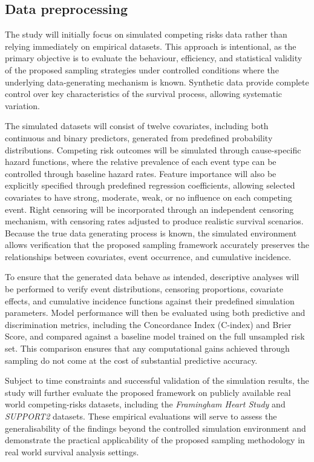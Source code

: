 \documentclass[a4paper,twoside,12pt]{report}
\begin{document}
\subsection{Data preprocessing}

The study will initially focus on simulated competing risks data rather than relying immediately on empirical datasets. This approach is intentional, as the primary objective is to evaluate the behaviour, efficiency, and statistical validity of the proposed sampling strategies under controlled conditions where the underlying data-generating mechanism is known. Synthetic data provide complete control over key characteristics of the survival process, allowing systematic variation.

The simulated datasets will consist of twelve covariates, including both continuous and binary predictors, generated from predefined probability distributions. Competing risk outcomes will be simulated through cause-specific hazard functions, where the relative prevalence of each event type can be controlled through baseline hazard rates. Feature importance will also be explicitly specified through predefined regression coefficients, allowing selected covariates to have strong, moderate, weak, or no influence on each competing event. Right censoring will be incorporated through an independent censoring mechanism, with censoring rates adjusted to produce realistic survival scenarios. Because the true data generating process is known, the simulated environment allows verification that the proposed sampling framework accurately preserves the relationships between covariates, event occurrence, and cumulative incidence.

To ensure that the generated data behave as intended, descriptive analyses will be performed to verify event distributions, censoring proportions, covariate effects, and cumulative incidence functions against their predefined simulation parameters. Model performance will then be evaluated using both predictive and discrimination metrics, including the Concordance Index (C-index) and Brier Score, and compared against a baseline model trained on the full unsampled risk set. This comparison ensures that any computational gains achieved through sampling do not come at the cost of substantial predictive accuracy.

Subject to time constraints and successful validation of the simulation results, the study will further evaluate the proposed framework on publicly available real world competing-risks datasets, including the \textit{Framingham Heart Study} and \textit{SUPPORT2} datasets. These empirical evaluations will serve to assess the generalisability of the findings beyond the controlled simulation environment and demonstrate the practical applicability of the proposed sampling methodology in real world survival analysis settings.
\end{document}
